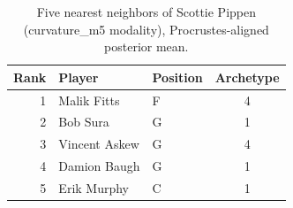\begin{table}[htbp]
  \centering\small
  \begin{tabular}{rllc}
    \toprule
    Rank & Player & Position & Archetype \\
    \midrule
    1 & Malik Fitts & F & 4 \\
    2 & Bob Sura & G & 1 \\
    3 & Vincent Askew & G & 4 \\
    4 & Damion Baugh & G & 1 \\
    5 & Erik Murphy & C & 1 \\
    \bottomrule
  \end{tabular}
  \caption{Five nearest neighbors of Scottie Pippen (curvature_m5 modality), Procrustes-aligned posterior mean.}
  \label{tab:Scottie_Pippen_neighbors_curvature_m5}
\end{table}

